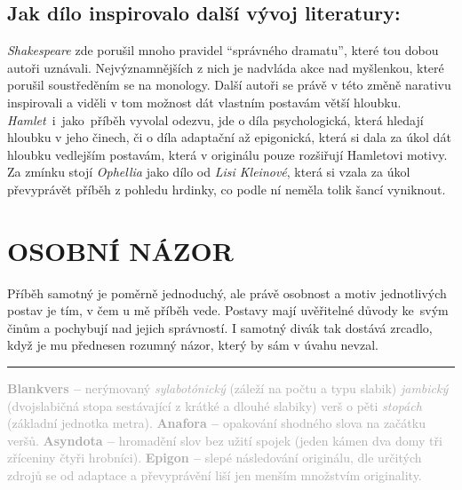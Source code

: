 \documentclass{extarticle} %
\begin{document}
\subsection*{Jak dílo inspirovalo další vývoj literatury:}
\noindent
\textit{Shakespeare} zde porušil mnoho pravidel \enquote{správného dramatu}, které tou dobou autoři uznávali.
Nejvýznamnějších z nich je nadvláda akce nad myšlenkou, které porušil soustředěním se na monology.
Další autoři se právě v této změně narativu inspirovali a viděli v tom možnost dát vlastním postavám větší hloubku.
\textit{Hamlet}~i~jako~příběh vyvolal odezvu, jde o díla psychologická, která hledají hloubku v jeho činech, či o díla adaptační až epigonická, která si dala za úkol dát hloubku vedlejším postavám, která v originálu pouze rozšiřují Hamletovi motivy. \\
Za zmínku stojí \textit{Ophellia} jako dílo od \textit{Lisi Kleinové}, která si vzala za úkol převyprávět příběh z pohledu hrdinky, co podle ní neměla tolik šancí vyniknout.


\section*{OSOBNÍ NÁZOR}
\noindent 
Příběh samotný je poměrně jednoduchý, ale právě osobnost a motiv jednotlivých postav je tím, v čem u mě příběh vede.
Postavy mají uvěřitelné důvody ke~svým činům a pochybují nad jejich správností.
I samotný divák tak dostává zrcadlo, když je mu přednesen rozumný názor, který by sám v úvahu nevzal.
    
\vfill

\noindent\begin{minipage}{\textwidth}
    \textcolor{darkgray}{\rule{\linewidth}{0.4pt}
    \changefontsize{5pt}\footnotesize
    \textbf{Blankvers --} nerýmovaný \textit{sylabotónický} (záleží na počtu a typu slabik) \textit{jambický} (dvojslabičná stopa sestávající z krátké a dlouhé slabiky) verš o pěti \textit{stopách} (základní jednotka metra).
    \textbf{Anafora --} opakování shodného slova na začátku veršů.
    \textbf{Asyndota --} hromadění slov bez užití spojek (jeden kámen dva domy tři zříceniny čtyři hrobníci).
    \textbf{Epigon --} slepé následování originálu, dle určitých zdrojů se od adaptace a převyprávění liší jen menším množstvím originality.
    }
\end{minipage}
\end{document}
